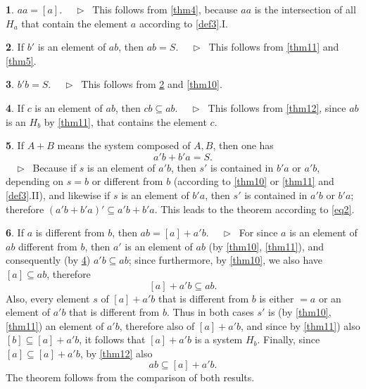 \documentclass[leqno,hidelinks,10pt]{article}
\theoremstyle{definition}
\newtheorem{satz}{\protect\satzname}
\newcommand{\satzname}{}
\renewcommand{\satzname}{\hspace{-4pt}.\ Satz}%
\renewcommand{\satzname}{\hspace{-4pt}.\ Theorem}%
\newcommand\Beweis{\medskip \newline $ \phantom{'.'} \rhd \ $}%
\newcommand\beweis{ $ \phantom{'.'} \rhd \ $}%
\newcommand{\partof}{\subseteq}
\newcommand{\sref}[1]{\underline{\ref{#1}}}%
\begin{document}
\begin{paracol}{2}
\begin{rightcolumn}
\begin{satz}\label{thm13}
$aa = [a]$.
\Beweis
This follows from \sref{thm4}, because $aa$ is the intersection of all $H_a$
that contain the element $a$ according to \sref{def3}.I.
\end{satz}

\begin{satz}\label{thm14}
If $b'$ is an element of $ab$, then $ab = S$.
\Beweis
This follows from \sref{thm11} and \sref{thm5}.
\end{satz}

\begin{satz}\label{thm15}
$b' b = S$.
\Beweis
This follows from \sref{thm14} and \sref{thm10}.
\end{satz}

\begin{satz}\label{thm16}
If $c$ is an element of $ab$, then $cb \partof ab$.
\Beweis
This follows from \sref{thm12}, since $ab$ is an $H_b$ by \sref{thm11}, that
contains the element $c$.
\end{satz}

\begin{satz}\label{thm17}
If $A + B$ means the system composed of $A, B$, then one has
\[
	a'b + b'a = S.
\]%
\beweis
Because if $s$ is an element of $a'b$, then $s'$ is contained in $b'a$ or $a'b$,
depending on $s = b$ or different from $b$ (according to \sref{thm10} or
\sref{thm11} and \sref{def3}.II), and likewise if $s$ is an element of $b'a$,
then $s'$ is contained in $a'b$ or $b'a$; therefore $(a'b + b'a)' \partof a'b + b'a$.
This leads to the theorem according to \eqref{eq2}.
\end{satz}

\begin{satz}\label{thm18}
If $a$ is different from $b$, then $ab = [a] + a'b$.
\Beweis
For since $a$ is an element of $ab$ different from $b$, then $a'$ is an element
of $ab$ (by \sref{thm10}, \sref{thm11}), and consequently (by \sref{thm16})
$a'b \partof ab$; since furthermore, by \sref{thm10}, we also have $[a]
\partof ab$, therefore
\[
	[a] + a'b \partof ab.
\]
Also, every element $s$ of $[a] + a'b$ that is different from $b$ is either
$= a$ or an element of $a'b$ that is different from $b$. Thus in both cases $s'$
is (by \sref{thm10}, \sref{thm11}) an element of $a'b$, therefore also of
$[a]+ a'b$, and since by \sref{thm11}) also $[b] \partof [a] + a'b$, it follows
that $[a] + a'b$ is a system $H_b$. Finally, since $[a] \partof [a] + a'b$, by
\sref{thm12} also
\[
	ab \partof [a] + a' b.
\]
The theorem follows from the comparison of both results.
\end{satz}


\end{rightcolumn}
\end{paracol}
\end{document}
